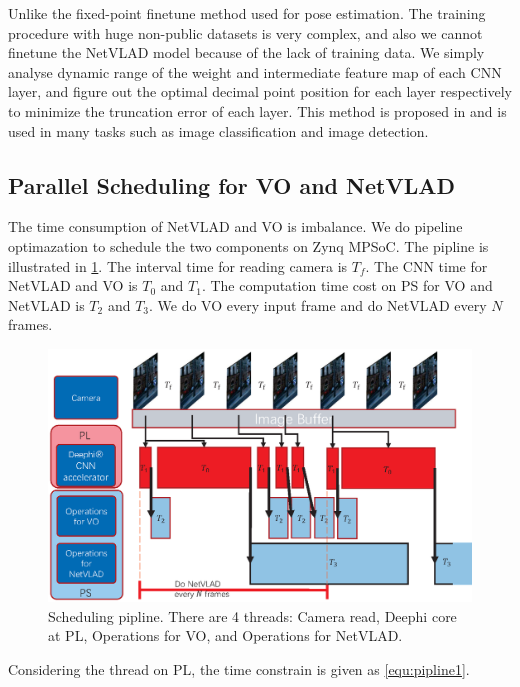 Unlike the fixed-point finetune method used for pose estimation. The training procedure with huge non-public datasets is very complex, and also we cannot finetune the NetVLAD model because of the lack of training data. We simply analyse dynamic range of the weight and intermediate feature map of each CNN layer, and figure out the optimal decimal point position for each layer respectively to minimize the truncation error of each layer.
This method is proposed in \cite{Qiu:2016151} and is used in many tasks such as image classification and image detection.

\subsection{Parallel Scheduling for VO and NetVLAD}

The time consumption of NetVLAD and VO is imbalance. We do pipeline optimazation to schedule the two components on Zynq MPSoC. The pipline is illustrated in \cref{fig:pipline}. The interval time for reading camera is $T_{f}$. The CNN time for NetVLAD and VO is $T_{0}$ and $T_{1}$. The computation time cost on PS for VO and NetVLAD is $T_{2}$ and $T_{3}$. We do VO every input frame and do NetVLAD every $N$ frames.

\begin{figure}[t]
    \centering  
    \includegraphics[width=0.95\linewidth]{fig/pipeline.eps}
    \caption{Scheduling pipline. There are 4 threads: Camera read, Deephi core at PL, Operations for VO, and Operations for NetVLAD.}
    \label{fig:pipline}
\end{figure}


Considering the thread on PL, the time constrain is given as \cref{equ:pipline1}. 

